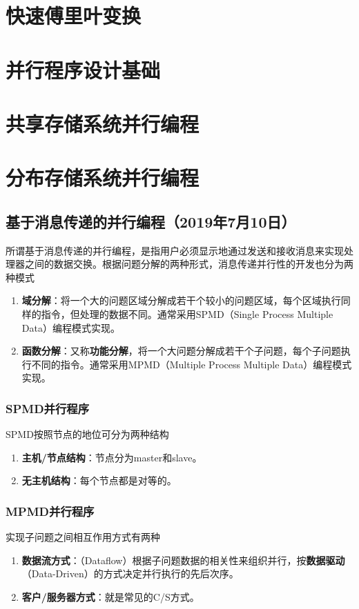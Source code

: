 \documentclass{article}
\begin{document}
		\section{快速傅里叶变换}
		\section{并行程序设计基础}
		\section{共享存储系统并行编程}
		\section{分布存储系统并行编程}
			\subsection{基于消息传递的并行编程（2019年7月10日）}
				所谓基于消息传递的并行编程，是指用户必须显示地通过发送和接收消息来实现处理器之间的数据交换。根据问题分解的两种形式，消息传递并行性的开发也分为两种模式
				\begin{enumerate}
					\item \textbf{域分解}：将一个大的问题区域分解成若干个较小的问题区域，每个区域执行同样的指令，但处理的数据不同。通常采用SPMD（Single Process Multiple Data）编程模式实现。
					\item \textbf{函数分解}：又称\textbf{功能分解}，将一个大问题分解成若干个子问题，每个子问题执行不同的指令。通常采用MPMD（Multiple Process Multiple Data）编程模式实现。
				\end{enumerate}
				\subsubsection{SPMD并行程序}
					SPMD按照节点的地位可分为两种结构
					\begin{enumerate}
						\item \textbf{主机/节点结构}：节点分为master和slave。
						\item \textbf{无主机结构}：每个节点都是对等的。
					\end{enumerate}
				\subsubsection{MPMD并行程序}
					实现子问题之间相互作用方式有两种
					\begin{enumerate}
						\item \textbf{数据流方式}：（Dataflow）根据子问题数据的相关性来组织并行，按\textbf{数据驱动}（Data-Driven）的方式决定并行执行的先后次序。
						\item \textbf{客户/服务器方式}：就是常见的C/S方式。
					\end{enumerate}
\end{document}
